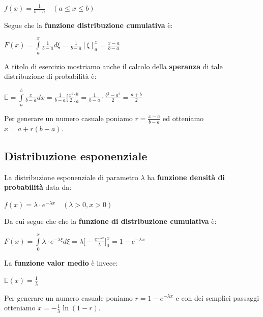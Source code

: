 \documentclass[11pt, oneside]{book}
\begin{document}
\begin{center}
$f(x) = \frac{1}{b-a} \quad (a \leq x \leq b)$  
\end{center}

Segue che la {\bf funzione distribuzione cumulativa} \`e:

\begin{center}
$F(x) = \int\limits_{a}^x \frac{1}{b-a}d\xi = \frac{1}{b-a}[\xi]_a^x =
\frac{x-a}{b-a}$
\end{center}

A titolo di esercizio mostriamo anche il calcolo della {\bf speranza}
di tale distribuzione di probabilit\`a \`e:

\begin{center}
$\mathbb{E} = \int\limits_{a}^b\frac{x}{b-a}dx = \frac{1}{b-a}\bigr
  [\frac{x^2}{2} \bigr ]_a^b = \frac{1}{b-a}\cdot\frac{b^2-a^2}{2} =
  \frac{a+b}{2} $
\end{center}

Per generare un numero casuale poniamo $r = \frac{x-a}{b-a}$ ed
otteniamo $x = a + r (b-a)$.

\subsection{Distribuzione esponenziale}

La distribuzione esponenziale di parametro $\lambda$ ha {\bf funzione
densit\`a di probabilit\`a} data da:

\begin{center}
$f(x) = \lambda \cdot e^{-\lambda x} \quad (\lambda > 0, x> 0)$
\end{center}

Da cui segue che che la {\bf funzione di distribuzione cumulativa}
\`e:

\begin{center}
$F(x) = \int\limits_{0}^{x} \lambda \cdot e^{-\lambda \xi} d\xi =
  \lambda \bigr [ - \frac{e^{-\lambda x}}{\lambda} \bigr ]_0^x = 1 -
  e^{-\lambda x}$  
\end{center}

La {\bf funzione valor medio} \`e invece:

\begin{center}
$\mathbb{E}(x) = \frac{1}{\lambda}$  
\end{center}

Per generare un numero casuale poniamo $r = 1-e^{-\lambda x}$ e con
dei semplici passaggi otteniamo $x = -\frac{1}{\lambda} \ln{(1-r)}$.
\end{document}
